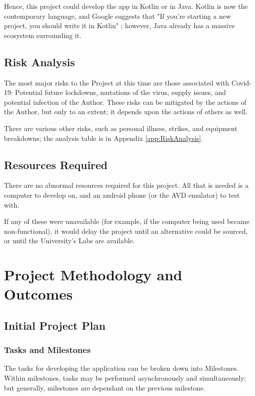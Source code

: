 \documentclass[11pt, a4paper, notitlepage]{report}
\begin{document}
Hence, this project could develop the app in Kotlin or in Java. Kotlin is now 
the contemporary language, and Google suggests that "If you’re starting a new 
project, you should write it in Kotlin" \citep{KotlinFirst}; however, Java already has a massive ecosystem surrounding it.

\section{Risk Analysis}
The most major risks to the Project at this time are those associated with 
Covid-19: Potential future lockdowns, mutations of the virus, supply issues, 
and potential infection of the Author. These risks can be mitigated by the 
actions of the Author, but only to an extent; it depends upon the actions of 
others as well.

There are various other risks, such as personal illness, strikes, and equipment 
breakdowns; the analysis table is in Appendix \ref{app:RiskAnalysis}.

\section{Resources Required}
There are no abnormal resources required for this project. All that is needed 
is a computer to develop on, and an android phone (or the AVD emulator) to test 
with.

If any of these were unavailable (for example, if the computer being used 
became non-functional), it would delay the project until an alternative could 
be sourced, or until the University's Labs are available.

\chapter{Project Methodology and Outcomes}
\section{Initial Project Plan}
\subsection{Tasks and Milestones}
The tasks for developing the application can be broken down into Milestones. 
Within milestones, tasks may be performed asynchronously and simultaneously; 
but generally, milestones are dependant on the previous milestone.
\end{document}
